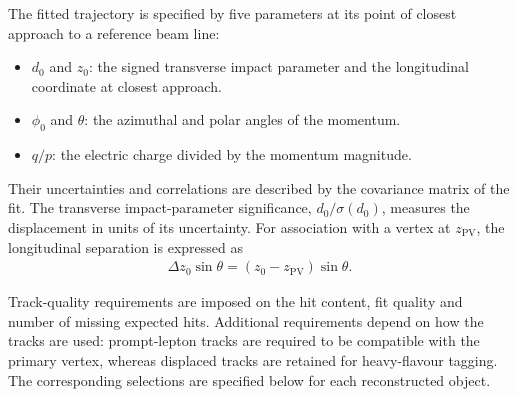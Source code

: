 The fitted trajectory is specified by five parameters at its point of closest approach to a reference beam line:
\begin{itemize}
    \item $d_0$ and $z_0$: the signed transverse impact parameter and the longitudinal coordinate at closest approach.
    \item $\phi_0$ and $\theta$: the azimuthal and polar angles of the momentum.
    \item $q/p$: the electric charge divided by the momentum magnitude.
\end{itemize}
Their uncertainties and correlations are described by the covariance matrix of the fit.
The transverse impact-parameter significance, $d_0/\sigma(d_0)$, measures the displacement in units of its uncertainty.
For association with a vertex at $z_{\mathrm{PV}}$, the longitudinal separation is expressed as
\begin{align}
    \Delta z_0\sin\theta=(z_0-z_{\mathrm{PV}})\sin\theta.
    \label{eq:ch6_track_longitudinal}
\end{align}

Track-quality requirements are imposed on the hit content, fit quality and number of missing expected hits.
Additional requirements depend on how the tracks are used: prompt-lepton tracks are required to be compatible with the primary vertex, whereas displaced tracks are retained for heavy-flavour tagging.
The corresponding selections are specified below for each reconstructed object.
